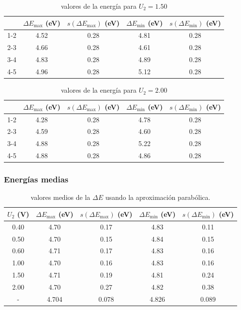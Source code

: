 \documentclass[12pt,a4paper]{article}
\numberwithin{equation}{section}
\numberwithin{figure}{section}
\begin{document}
\newpage
 
\begin{table}[h!] \centering 
\begin{tabular}{ccccc} 
\hline  & $ \Delta E_{\max} $ (eV) & $s(\Delta E_{\max})$ (eV) & $ \Delta E_{\min} $ (eV) & $s(\Delta E_{\min})$ (eV) \\ \hline 
1-2 & 4.52 & 0.28 & 4.81 & 0.28 \\ 
2-3 & 4.66 & 0.28 & 4.61 & 0.28 \\ 
3-4 & 4.83 & 0.28 & 4.89 & 0.28 \\ 
4-5 & 4.96 & 0.28 & 5.12 & 0.28 \\ 
\hline 
\end{tabular}\caption{valores de la energía para $U_2=1.50$} 
\label{Tab:E-lab-5} 
\end{table} 

\begin{table}[h!] \centering 
\begin{tabular}{ccccc} 
\hline  & $ \Delta E_{\max} $ (eV) & $s(\Delta E_{\max})$ (eV) & $ \Delta E_{\min} $ (eV) & $s(\Delta E_{\min})$ (eV) \\ \hline 
1-2 & 4.28 & 0.28 & 4.78 & 0.28 \\ 
2-3 & 4.59 & 0.28 & 4.60 & 0.28 \\ 
3-4 & 4.88 & 0.28 & 5.22 & 0.28 \\ 
4-5 & 4.88 & 0.28 & 4.86 & 0.28 \\ 
\hline 
\end{tabular}\caption{valores de la energía para $U_2=2.00$} 
\label{Tab:E-lab-6} 
\end{table} 

\subsubsection{Energías medias}

\begin{table}[h!] \centering 
\begin{tabular}{ccccc} 
\hline $U_2$ (V) & $ \Delta E_{\max} $ (eV) & $s(\Delta E_{\max})$ (eV) & $ \Delta E_{\min} $ (eV) & $s(\Delta E_{\min})$ (eV) \\ \hline 
0.40 & 4.70 & 0.17 & 4.83 & 0.11 \\ 
0.50 & 4.70 & 0.15 & 4.84 & 0.15 \\ 
0.60 & 4.71 & 0.17 & 4.83 & 0.16 \\ 
1.00 & 4.70 & 0.16 & 4.83 & 0.16 \\ 
1.50 & 4.71 & 0.19 & 4.81 & 0.24 \\ 
2.00 & 4.70 & 0.27 & 4.82 & 0.38 \\ 
\hline \hline 
- & 4.704 & 0.078 & 4.826 & 0.089 \\ 
\hline
\end{tabular}
\caption{valores medios de la $\Delta E$  usando la aproximación parabólica.} 
\label{Tab:Em-1-par} 
\end{table} 
\end{document}
